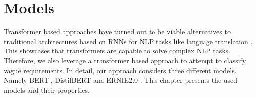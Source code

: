 \section{Models}
\label{chp:approach:sec:models}

Transformer based approaches have turned out to be viable alternatives to traditional architectures based on \acp{RNN} for \ac{NLP} tasks like language translation \parencites{Gehring:2017}{Vaswani:2017}.
This showcases that transformers are capable to solve complex \ac{NLP} tasks.
Therefore, we also leverage a transformer based approach to attempt to classify vague requirements.
In detail, our approach considers three different models.
Namely \ac{BERT} \parencite{Devlin:2018}, \ac{DistilBERT} \parencite{Sanh:2019} and \ac{ERNIE2.0} \parencite{Sun:2019a}.
This chapter presents the used models and their properties.




